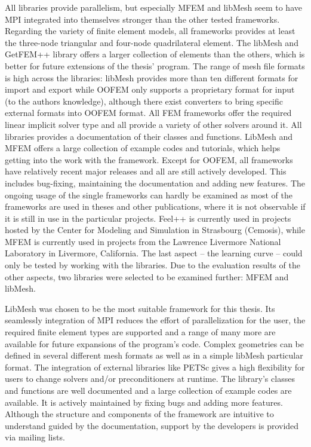   All libraries provide parallelism, but especially MFEM and libMesh seem to have MPI integrated into themselves stronger than the other tested frameworks. Regarding the variety of finite element models, all frameworks provides at least the three-node triangular and four-node quadrilateral element. The libMesh and GetFEM++ library offers a larger collection of elements than the others, which is better for future extensions of the thesis' program. The range of mesh file formats is high across the libraries: libMesh provides more than ten different formats for import and export while OOFEM only supports a proprietary format for input (to the authors knowledge), although there exist converters to bring specific external formats into OOFEM format. All FEM frameworks offer the required linear implicit solver type and all provide a variety of other solvers around it. All libraries provides a documentation of their classes and functions. LibMesh and MFEM offers a large collection of example codes and tutorials, which helps getting into the work with the framework. Except for OOFEM, all frameworks have relatively recent major releases and all are still actively developed. This includes bug-fixing, maintaining the documentation and adding new features. The ongoing usage of the single frameworks can hardly be examined as most of the frameworks are used in theses and other publications, where it is not observable if it is still in use in the particular projects. Feel++ is currently used in projects hosted by the Center for Modeling and Simulation in Strasbourg (Cemosis), while MFEM  is currently used in projects from the Lawrence Livermore National Laboratory in Livermore, California. The last aspect -- the learning curve -- could only be tested by working with the libraries. Due to the evaluation results of the other aspects, two libraries were selected to be examined further: MFEM and libMesh.
  
  LibMesh was chosen to be the most suitable framework for this thesis. Its seamlessly integration of MPI reduces the effort of parallelization for the user, the required finite element types are supported and a range of many more are available for future expansions of the program's code. Complex geometries can be defined in several different mesh formats as well as in a simple libMesh particular format. The integration of external libraries like PETSc gives a high flexibility for users to change solvers and/or preconditioners at runtime. The library's classes and functions are well documented and a large collection of example codes are available. It is actively maintained by fixing bugs and adding more features. Although the structure and components of the framework are intuitive to understand guided by the documentation, support by the developers is provided via mailing lists.